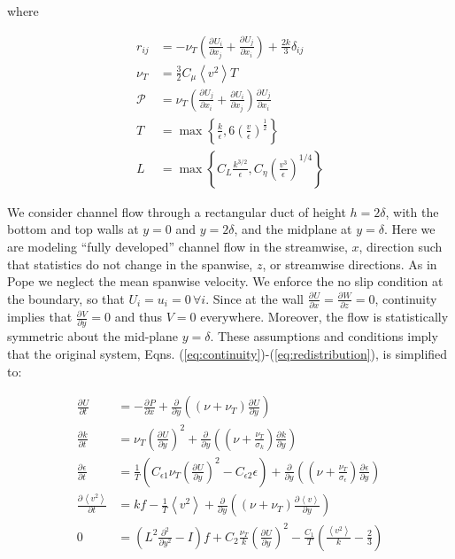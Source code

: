 \documentclass[a4paper,11pt]{article}
\newcommand{\chevron}[1]{\left\langle #1 \right\rangle}
\newcommand{\pderiv}[3][]{%
  \ensuremath{\frac{\partial^{#1} {#2}}{\partial {#3}^{#1}}}}
\newcommand{\noi}{\noindent}
\newcommand{\ep}{\epsilon}
\begin{document}
\noi where 

\begin{align*}
r_{ij} &= -\nu_T\left(\pderiv{U_i}{x_j} + \pderiv{U_j}{x_i}\right) +
\frac{2k}{3}\delta_{ij}\\
\nu_T &= \frac{3}{2}C_\mu \chevron{v^2} T \\
\mathcal{P} &= \nu_T\left( \pderiv{U_j}{x_i} + \pderiv{U_i}{x_j}\right)\pderiv{U_j}{x_i} \\
T &= \max \left\{ \frac{k}{\ep} , 6 \left( \frac{v}{\ep} \right)^{\frac{1}{2}}
\right\} \\
L &= \max \left\{ C_L \frac{k^{3/2}}{\ep}, C_\eta \left( \frac{v^3}{\ep}
\right)^{1/4} \right\}
\end{align*}

We consider channel flow through a rectangular duct of height $h= 2\delta$, with
the bottom and top walls at $y=0$ and $y=2\delta$, and the midplane at
$y=\delta$.
Here we are modeling ``fully developed'' channel flow in the streamwise, $x$,
direction such that statistics do not change in the spanwise, $z$, or
streamwise directions. As in Pope \cite{pope} we neglect the mean spanwise
velocity. 
We enforce the no slip condition at the boundary, so that
$U_i=u_i=0 \, \forall i$. Since at the wall
$\pderiv{U}{x}=\pderiv{W}{z} = 0$, continuity implies that
$\pderiv{V}{y}=0$ and thus $V=0$ everywhere. Moreover, the flow is statistically
symmetric about the mid-plane $y = \delta$. These assumptions and conditions
imply that the original system, Eqns.
(\ref{eq:continuity})-(\ref{eq:redistribution}), is simplified to: 

\begin{align}
	\label{eq:ssv2f1}
        \pderiv{U}{t} &= -\pderiv{P}{x} +
\pderiv{}{y}\left((\nu+\nu_T)\pderiv{U}{y}\right) \\
        \pderiv{k}{t} &= \nu_T\left(\pderiv{U}{y}\right)^2 + 
\pderiv{}{y}\left((\nu+\frac{\nu_T}{\sigma_k})\pderiv{k}{y}\right) \\
        \pderiv{\ep}{t} &= \frac{1}{T}\left(C_{\ep
1}\nu_T\left(\pderiv{U}{y}\right)^2 - C_{\ep 2}\ep\right) + 
\pderiv{}{y}\left((\nu+\frac{\nu_T}{\sigma_\ep})\pderiv{\ep}{y}\right) \\
        \pderiv{\chevron{v^2}}{t} &= kf - \frac{1}{T}\chevron{v^2} +
\pderiv{}{y}\left((\nu+\nu_T)\pderiv{\chevron{v}}{y}\right) \\
        0 &= \left( L^2\frac{\partial^2}{\partial y^2} - I\right)f +
C_2\frac{\nu_T}{k}\left(\pderiv{U}{y}\right)^2 -
\frac{C_1}{T}\left(\frac{\chevron{v^2}}{k}-\frac{2}{3}\right)
	\label{eq:ssv2f5}
\end{align}
\end{document}
